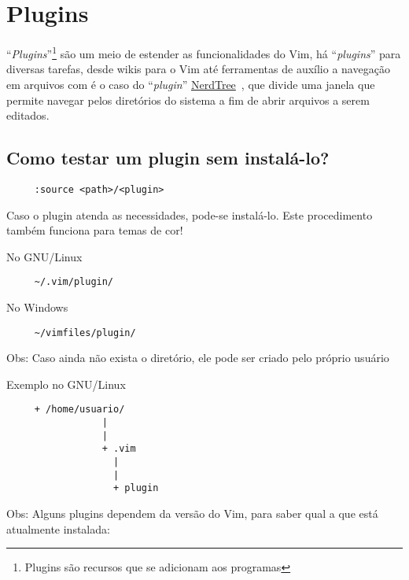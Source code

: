 
\chapter{Plugins}\label{Plugins}
``{\em Plugins}''\footnote{Plugins são recursos que se adicionam aos programas}
são um meio de estender as funcionalidades do Vim, há ``{\em plugins}'' para
diversas tarefas, desde wikis para o Vim até ferramentas de auxílio a navegação
em arquivos com é o caso do ``{\em plugin}''
\href{http://www.vim.org/scripts/script.php?script\_id=1658}{NerdTree}~\cite{PluginNerdTree}, que
divide uma janela que permite navegar pelos diretórios do sistema a fim de
abrir arquivos a serem editados.

\section{Como testar um plugin sem instalá-lo?}
\label{Como testar um plugin sem instala-lo?}

\begin{verbatim}
     :source <path>/<plugin>
\end{verbatim}

Caso o plugin atenda as necessidades, pode-se instalá-lo. Este
procedimento também funciona para temas de cor!


No GNU/Linux
\begin{verbatim}
     ~/.vim/plugin/
\end{verbatim}

No Windows

\begin{verbatim}
     ~/vimfiles/plugin/
\end{verbatim}

Obs: Caso ainda não exista o diretório, ele pode ser criado pelo próprio usuário

Exemplo no GNU/Linux

\begin{verbatim}
     + /home/usuario/
                 |
                 |
                 + .vim
                   |
                   |
                   + plugin
\end{verbatim}

Obs: Alguns plugins dependem da versão do Vim, para saber qual
a que está atualmente instalada:

